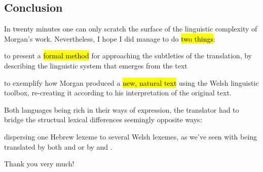 \begin{paper}
	\section{Conclusion}

	In twenty minutes one can only scratch the surface of the linguistic complexity of Morgan’s work. Nevertheless, I hope I did manage to do \hl{two things}:
	\begin{compactitem}
		\item to present a \hl{formal method} for approaching the subtleties of the translation, by describing the linguistic system that emerges from the text
		\item to exemplify how Morgan produced a \hl{new, natural text} using the Welsh linguistic toolbox, re-creating it according to his interpretation of the original text.
	\end{compactitem}

	Both languages being rich in their ways of expression, the translator had to bridge the structual lexical differences seemingly opposite ways:
	\begin{compactitem}
	\item dispersing one Hebrew lexeme to several Welsh lexemes, as we’ve seen with  being translated by both  and  or  by  and .\tounfold{***}
	\end{compactitem}

	Thank you very much!
\end{paper}
